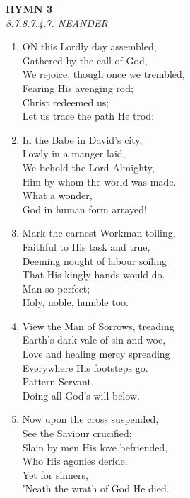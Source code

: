 \newpage
\begin{center}
    {\Large \textbf{HYMN 3}}
    \\
    \textit{8.7.8.7.4.7. NEANDER}
\end{center}
\vspace{1em}

\begin{enumerate}
    \item ON this Lordly day assembled, \\
        Gathered by the call of God, \\
        We rejoice, though once we trembled, \\
        Fearing His avenging rod; \\
        Christ redeemed us; \\
        Let us trace the path He trod:

    \item In the Babe in David's city, \\
        Lowly in a manger laid, \\
        We behold the Lord Almighty, \\
        Him by whom the world was made. \\
        What a wonder, \\
        God in human form arrayed!

    \item Mark the earnest Workman toiling, \\
        Faithful to His task and true, \\
        Deeming nought of labour soiling \\
        That His kingly hands would do. \\
        Man so perfect; \\
        Holy, noble, humble too.

    \item View the Man of Sorrows, treading \\
        Earth's dark vale of sin and woe, \\
        Love and healing mercy spreading \\
        Everywhere His footsteps go. \\
        Pattern Servant, \\
        Doing all God's will below.

    \item Now upon the cross suspended, \\
        See the Saviour crucified; \\
        Slain by men His love befriended, \\
        Who His agonies deride. \\
        Yet for sinners, \\
        'Neath the wrath of God He died.


\end{enumerate}
